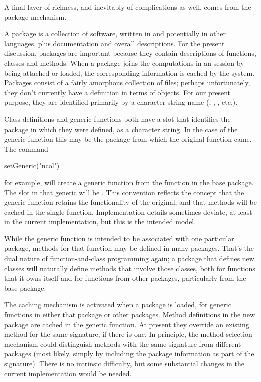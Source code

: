 \documentclass[11pt]{article}
\begin{document}
A final layer of richness, and inevitably of complications as well, comes from the \R{} package mechanism.

A package is a collection of software, written in \R{} and potentially in other languages, plus documentation and overall descriptions.
For the present discussion, packages are important because they contain descriptions of functions, classes and methods.
When a package joins the computations in an \R{} session by being attached or loaded, the corresponding information is cached by the \R{} system.
Packages consist of a fairly amorphous collection of files; perhaps unfortunately, they don't currently have a definition in terms of objects.
For our present purpose, they are identified primarily by a character-string name (, , , etc.).

Class definitions and generic functions both have a  slot that identifies the package in which they were defined, as a character string.
In the case of the generic function this may be the package from which the original function came.
The command
\begin{Example}
setGeneric("ncol")
\end{Example}
for example, will create a generic function from the function  in the base package.  The  slot in that generic will be .
This convention reflects the concept that the generic function retains the functionality of the original, and that methods will be cached in the single function.
Implementation details sometimes deviate, at least in the current implementation, but this is the intended model.

While the generic function is intended to be associated with one particular package, methods for that function may be defined in many packages.
That's the dual nature of function-and-class programming again; a package that defines new classes will naturally define methods that involve those classes, both for functions that it owns itself and for functions from other packages, particularly from the base package.

The caching mechanism is activated when a package is loaded, for generic functions in either that package or other packages.
Method definitions in the new package are cached in the generic function.
At present they override an existing method for the same signature, if there is one.
In principle, the method selection mechanism could distinguish methods with the same signature from different packages (most likely, simply by including the package information as part of the signature).
There is no intrinsic difficulty, but some substantial changes in the current implementation would be needed.
\end{document}
